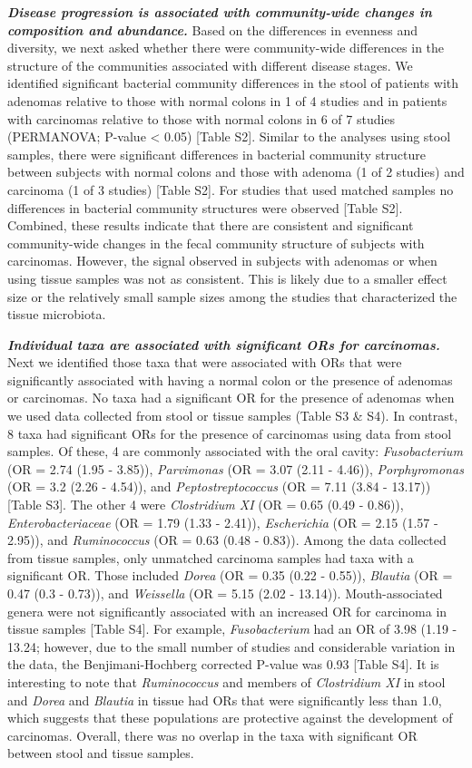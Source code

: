 \documentclass[12pt,]{article}
\begin{document}
\textbf{\emph{Disease progression is associated with community-wide
changes in composition and abundance.}} Based on the differences in
evenness and diversity, we next asked whether there were community-wide
differences in the structure of the communities associated with
different disease stages. We identified significant bacterial community
differences in the stool of patients with adenomas relative to those
with normal colons in 1 of 4 studies and in patients with carcinomas
relative to those with normal colons in 6 of 7 studies (PERMANOVA;
P-value \textless{} 0.05) {[}Table S2{]}. Similar to the analyses using
stool samples, there were significant differences in bacterial community
structure between subjects with normal colons and those with adenoma (1
of 2 studies) and carcinoma (1 of 3 studies) {[}Table S2{]}. For studies
that used matched samples no differences in bacterial community
structures were observed {[}Table S2{]}. Combined, these results
indicate that there are consistent and significant community-wide
changes in the fecal community structure of subjects with carcinomas.
However, the signal observed in subjects with adenomas or when using
tissue samples was not as consistent. This is likely due to a smaller
effect size or the relatively small sample sizes among the studies that
characterized the tissue microbiota.

\textbf{\emph{Individual taxa are associated with significant ORs for
carcinomas.}} Next we identified those taxa that were associated with
ORs that were significantly associated with having a normal colon or the
presence of adenomas or carcinomas. No taxa had a significant OR for the
presence of adenomas when we used data collected from stool or tissue
samples (Table S3 \& S4). In contrast, 8 taxa had significant ORs for
the presence of carcinomas using data from stool samples. Of these, 4
are commonly associated with the oral cavity: \emph{Fusobacterium} (OR =
2.74 (1.95 - 3.85)), \emph{Parvimonas} (OR = 3.07 (2.11 - 4.46)),
\emph{Porphyromonas} (OR = 3.2 (2.26 - 4.54)), and
\emph{Peptostreptococcus} (OR = 7.11 (3.84 - 13.17)) {[}Table S3{]}. The
other 4 were \emph{Clostridium XI} (OR = 0.65 (0.49 - 0.86)),
\emph{Enterobacteriaceae} (OR = 1.79 (1.33 - 2.41)), \emph{Escherichia}
(OR = 2.15 (1.57 - 2.95)), and \emph{Ruminococcus} (OR = 0.63 (0.48 -
0.83)). Among the data collected from tissue samples, only unmatched
carcinoma samples had taxa with a significant OR. Those included
\emph{Dorea} (OR = 0.35 (0.22 - 0.55)), \emph{Blautia} (OR = 0.47 (0.3 -
0.73)), and \emph{Weissella} (OR = 5.15 (2.02 - 13.14)).
Mouth-associated genera were not significantly associated with an
increased OR for carcinoma in tissue samples {[}Table S4{]}. For
example, \emph{Fusobacterium} had an OR of 3.98 (1.19 - 13.24; however,
due to the small number of studies and considerable variation in the
data, the Benjimani-Hochberg corrected P-value was 0.93 {[}Table S4{]}.
It is interesting to note that \emph{Ruminococcus} and members of
\emph{Clostridium XI} in stool and \emph{Dorea} and \emph{Blautia} in
tissue had ORs that were significantly less than 1.0, which suggests
that these populations are protective against the development of
carcinomas. Overall, there was no overlap in the taxa with significant
OR between stool and tissue samples.
\end{document}
